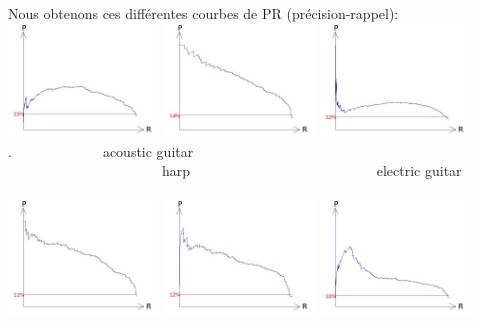 \documentclass[a4paper,11pt]{report}
\begin{document}
Nous obtenons ces différentes courbes de PR (précision-rappel):\\
\noindent
\includegraphics[width=0.3\textwidth]{RP_acoustic_guitar.jpg}\hfill
\includegraphics[width=0.3\textwidth]{RP_harp.jpg}\hfill
\includegraphics[width=0.3\textwidth]{RP_electric_guitar.jpg}\\
.~~~~~~~~~~~~~acoustic guitar ~~~~~~~~~~~~~~~~~~~~~~harp~~~~~~~~~~~~~~~~~~~~~~~~~~ electric guitar\\\\
\includegraphics[width=0.3\textwidth]{RP_ambulance.jpg}\hfill
\includegraphics[width=0.3\textwidth]{RP_minivan.jpg}\hfill
\includegraphics[width=0.3\textwidth]{RP_taxi.jpg}\\
\end{document}
